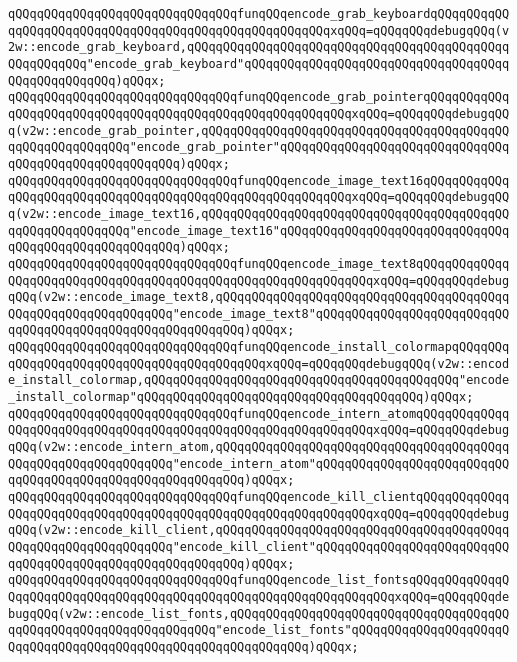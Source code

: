 \verb|qQQqqQQqqQQqqQQqqQQqqQQqqQQqqQQqfunqQQqencode_grab_keyboardqQQqqQQqqQQqqQQqqQQqqQQqqQQqqQQqqQQqqQQqqQQqqQQqqQQqqQQqxqQQq=qQQqqQQqdebugqQQq(v2w::encode_grab_keyboard,qQQqqQQqqQQqqQQqqQQqqQQqqQQqqQQqqQQqqQQqqQQqqQQqqQQqqQQq"encode_grab_keyboard"qQQqqQQqqQQqqQQqqQQqqQQqqQQqqQQqqQQqqQQqqQQqqQQqqQQq)qQQqx;|\newline
\verb|qQQqqQQqqQQqqQQqqQQqqQQqqQQqqQQqfunqQQqencode_grab_pointerqQQqqQQqqQQqqQQqqQQqqQQqqQQqqQQqqQQqqQQqqQQqqQQqqQQqqQQqqQQqxqQQq=qQQqqQQqdebugqQQq(v2w::encode_grab_pointer,qQQqqQQqqQQqqQQqqQQqqQQqqQQqqQQqqQQqqQQqqQQqqQQqqQQqqQQqqQQq"encode_grab_pointer"qQQqqQQqqQQqqQQqqQQqqQQqqQQqqQQqqQQqqQQqqQQqqQQqqQQqqQQq)qQQqx;|\newline
\verb|qQQqqQQqqQQqqQQqqQQqqQQqqQQqqQQqfunqQQqencode_image_text16qQQqqQQqqQQqqQQqqQQqqQQqqQQqqQQqqQQqqQQqqQQqqQQqqQQqqQQqqQQqxqQQq=qQQqqQQqdebugqQQq(v2w::encode_image_text16,qQQqqQQqqQQqqQQqqQQqqQQqqQQqqQQqqQQqqQQqqQQqqQQqqQQqqQQqqQQq"encode_image_text16"qQQqqQQqqQQqqQQqqQQqqQQqqQQqqQQqqQQqqQQqqQQqqQQqqQQqqQQq)qQQqx;|\newline
\verb|qQQqqQQqqQQqqQQqqQQqqQQqqQQqqQQqfunqQQqencode_image_text8qQQqqQQqqQQqqQQqqQQqqQQqqQQqqQQqqQQqqQQqqQQqqQQqqQQqqQQqqQQqqQQqxqQQq=qQQqqQQqdebugqQQq(v2w::encode_image_text8,qQQqqQQqqQQqqQQqqQQqqQQqqQQqqQQqqQQqqQQqqQQqqQQqqQQqqQQqqQQqqQQq"encode_image_text8"qQQqqQQqqQQqqQQqqQQqqQQqqQQqqQQqqQQqqQQqqQQqqQQqqQQqqQQqqQQq)qQQqx;|\newline
\verb|qQQqqQQqqQQqqQQqqQQqqQQqqQQqqQQqfunqQQqencode_install_colormapqQQqqQQqqQQqqQQqqQQqqQQqqQQqqQQqqQQqqQQqqQQqxqQQq=qQQqqQQqdebugqQQq(v2w::encode_install_colormap,qQQqqQQqqQQqqQQqqQQqqQQqqQQqqQQqqQQqqQQqqQQq"encode_install_colormap"qQQqqQQqqQQqqQQqqQQqqQQqqQQqqQQqqQQqqQQq)qQQqx;|\newline
\verb|qQQqqQQqqQQqqQQqqQQqqQQqqQQqqQQqfunqQQqencode_intern_atomqQQqqQQqqQQqqQQqqQQqqQQqqQQqqQQqqQQqqQQqqQQqqQQqqQQqqQQqqQQqqQQqxqQQq=qQQqqQQqdebugqQQq(v2w::encode_intern_atom,qQQqqQQqqQQqqQQqqQQqqQQqqQQqqQQqqQQqqQQqqQQqqQQqqQQqqQQqqQQqqQQq"encode_intern_atom"qQQqqQQqqQQqqQQqqQQqqQQqqQQqqQQqqQQqqQQqqQQqqQQqqQQqqQQqqQQq)qQQqx;|\newline
\verb|qQQqqQQqqQQqqQQqqQQqqQQqqQQqqQQqfunqQQqencode_kill_clientqQQqqQQqqQQqqQQqqQQqqQQqqQQqqQQqqQQqqQQqqQQqqQQqqQQqqQQqqQQqqQQqxqQQq=qQQqqQQqdebugqQQq(v2w::encode_kill_client,qQQqqQQqqQQqqQQqqQQqqQQqqQQqqQQqqQQqqQQqqQQqqQQqqQQqqQQqqQQqqQQq"encode_kill_client"qQQqqQQqqQQqqQQqqQQqqQQqqQQqqQQqqQQqqQQqqQQqqQQqqQQqqQQqqQQq)qQQqx;|\newline
\verb|qQQqqQQqqQQqqQQqqQQqqQQqqQQqqQQqfunqQQqencode_list_fontsqQQqqQQqqQQqqQQqqQQqqQQqqQQqqQQqqQQqqQQqqQQqqQQqqQQqqQQqqQQqqQQqqQQqxqQQq=qQQqqQQqdebugqQQq(v2w::encode_list_fonts,qQQqqQQqqQQqqQQqqQQqqQQqqQQqqQQqqQQqqQQqqQQqqQQqqQQqqQQqqQQqqQQqqQQq"encode_list_fonts"qQQqqQQqqQQqqQQqqQQqqQQqqQQqqQQqqQQqqQQqqQQqqQQqqQQqqQQqqQQqqQQq)qQQqx;|\newline
